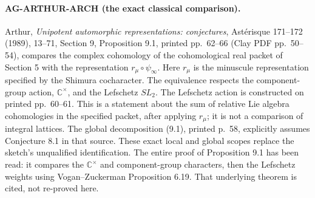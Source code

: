 \paragraph{AG-ARTHUR-ARCH (the exact classical comparison).}
Arthur, \emph{Unipotent automorphic representations: conjectures},
Astérisque 171--172 (1989), 13--71, Section 9,
Proposition 9.1, printed pp.~62--66 (Clay PDF pp.~50--54),
compares the complex cohomology of the cohomological real packet
of Section 5 with the representation $r_\mu\circ\psi_\infty$.
Here $r_\mu$ is the minuscule representation specified by the
Shimura cocharacter. The equivalence respects the component-group
action, $\mathbb C^\times$, and the Lefschetz $SL_2$.
The Lefschetz action is constructed on printed pp.~60--61.
This is a statement about the sum of relative Lie algebra
cohomologies in the specified packet, after applying $r_\mu$;
it is not a comparison of integral lattices. The global
decomposition (9.1), printed p.~58, explicitly assumes
Conjecture 8.1 in that source. These exact local and global
scopes replace the sketch's unqualified identification.
The entire proof of Proposition 9.1 has been read: it compares
the $\mathbb C^\times$ and component-group characters, then the
Lefschetz weights using Vogan--Zuckerman Proposition 6.19.
That underlying theorem is cited, not re-proved here.

